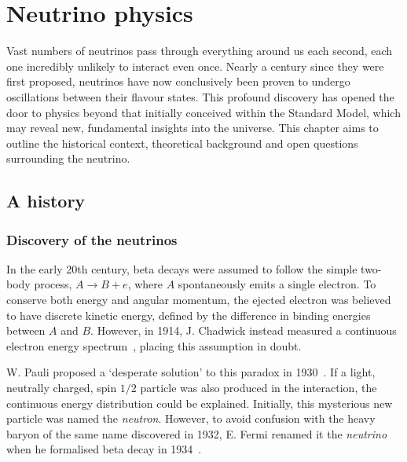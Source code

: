 \chapter{Neutrino physics} %
\label{chap:theory} %

Vast numbers of neutrinos pass through everything around us each second, each one incredibly
unlikely to interact even once. Nearly a century since they were first proposed, neutrinos have
now conclusively been proven to undergo oscillations between their flavour states. This profound
discovery has opened the door to physics beyond that initially conceived within the Standard
Model, which may reveal new, fundamental insights into the universe. This chapter aims to outline
the historical context, theoretical background and open questions surrounding the neutrino.

\section{A history} %
\label{sec:theory_history} %

\subsection{Discovery of the neutrinos} %
\label{sec:theory_history_neutrinos} %

In the early 20th century, beta decays were assumed to follow the simple two-body process,
$A\rightarrow B + e$, where $A$ spontaneously emits a single electron. To conserve both energy and
angular momentum, the ejected electron was believed to have discrete kinetic energy, defined by
the difference in binding energies between $A$ and $B$. However, in 1914, J. Chadwick instead
measured a continuous electron energy spectrum~\cite{chadwick1914}, placing this assumption in
doubt.

W. Pauli proposed a `desperate solution' to this paradox in 1930~\cite{pauli1930}. If a light,
neutrally charged, spin $1/2$ particle was also produced in the interaction, the continuous energy
distribution could be explained. Initially, this mysterious new particle was named the
\emph{neutron}. However, to avoid confusion with the heavy baryon of the same name discovered in
1932, E. Fermi renamed it the \emph{neutrino} when he formalised beta decay in
1934~\cite{fermi1934}.


